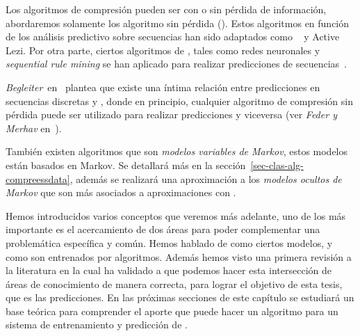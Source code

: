 Los algoritmos de compresión pueden ser con o sin pérdida de información, abordaremos solamente los algoritmo sin pérdida (\losslessdatacompression). Estos algoritmos en función de los análisis predictivo sobre secuencias han sido adaptados como \lzSieteOcho~\cite{ZivLempel1978} y Active Lezi\cite{Gopalratnam2007}. Por otra parte, ciertos algoritmos de \machinelearning, tales como redes neuronales y \emph{sequential rule mining} se han aplicado para realizar predicciones de secuencias~\cite{Gueniche2015}.

\emph{Begleiter}~\etal en~\cite{Begleiter2004} plantea que existe una  íntima relación entre predicciones  en secuencias discretas y \losslessdatacompression, donde en principio, cualquier algoritmo de compresión sin pérdida puede ser utilizado para realizar predicciones y viceversa (ver \emph{Feder y Merhav} en~\cite{Feder1992}).

También existen algoritmos que son \emph{modelos variables de Markov}, estos modelos están basados en Markov. Se detallará más en la sección~\ref{sec-clas-alg-compreessdata}, además se realizará una aproximación a los \emph{modelos ocultos de Markov} que son más asociados a aproximaciones con \machinelearning.




\mediocm
Hemos introducidos varios conceptos que veremos más adelante, uno de los más importante es el acercamiento de dos áreas para poder complementar una problemática específica y común. Hemos hablado de como ciertos modelos, y como son entrenados por algoritmos. Además hemos visto una primera revisión a la literatura en la cual ha validado a que podemos hacer esta intersección de áreas de conocimiento de manera correcta, para lograr el objetivo de esta tesis, que es las predicciones. En las próximas secciones de este capítulo se estudiará un base teórica para comprender el aporte que puede hacer un algoritmo \losslessdatacompression para un sistema de entrenamiento y predicción de \machinelearning.


 




